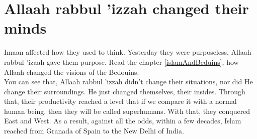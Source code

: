 {\section*{Allaah rabbul ’izzah changed their minds}
Imaan affected how they used to think. Yesterday they were purposeless, Allaah rabbul 'izaah gave them purpose. Read the chapter \ref{islamAndBeduins}, how Allaah changed the visions of the Bedouins. \\

You can see that, Allaah rabbul 'izzah didn't change their situations, nor did He change their surroundings. He just changed themselves, their insides. Through that, their productivity reached a level that if we compare it with a normal human being, then they will be called superhumans. With that, they conquered East and West. As a result, against all the odds, within a few decades, Islam reached from Granada of Spain to the New Delhi of India. 
}